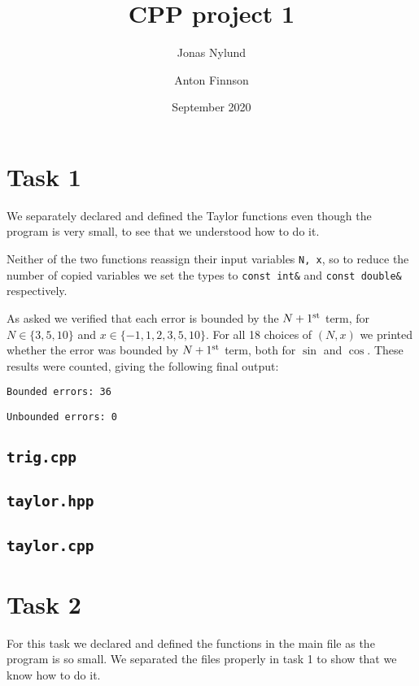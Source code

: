 \documentclass[12pt]{article}
\title{CPP project 1}
\author{Jonas Nylund \and Anton Finnson}
\date{September 2020}
\begin{document}
\maketitle

\section{Task 1}
We separately declared and defined the Taylor functions even though the program is very small, to see that we understood how to do it.

Neither of the two functions reassign their input variables \lstinline{N, x}, so to reduce the number of copied variables we set the types to \lstinline{const int&} and \lstinline{const double&} respectively.

As asked we verified that each error is bounded by the $N+1^{\rm{st}}$ term, for $N \in \{3,5,10\}$ and $x \in \{−1,1,2,3,5,10\}$. For all 18 choices of $(N,x)$ we printed whether the error was bounded by $N+1^{\rm{st}}$ term, both for $\sin$ and $\cos$. These results were counted, giving the following final output:

\lstinline{Bounded errors: 36}

\lstinline{Unbounded errors: 0}


\subsection*{\texttt{trig.cpp}}


\subsection*{\texttt{taylor.hpp}}


\subsection*{\texttt{taylor.cpp}}


\newpage
\section{Task 2}
For this task we declared and defined the functions in the main file as the program is so small. We separated the files properly in task 1 to show that we know how to do it.
\end{document}
